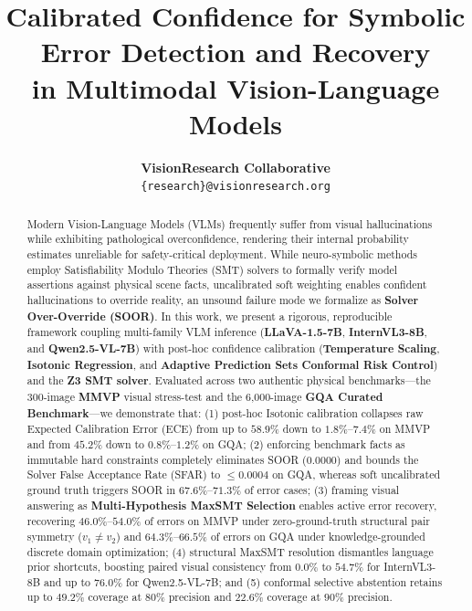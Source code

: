 \documentclass[10pt,twocolumn,letterpaper]{article}
\title{\textbf{Calibrated Confidence for Symbolic Error Detection and Recovery\\in Multimodal Vision-Language Models}}
\author{
  \textbf{VisionResearch Collaborative}\\
  \texttt{\{research\}@visionresearch.org}
}
\date{}
\begin{document}
\maketitle

\begin{abstract}
Modern Vision-Language Models (VLMs) frequently suffer from visual hallucinations while exhibiting pathological overconfidence, rendering their internal probability estimates unreliable for safety-critical deployment. While neuro-symbolic methods employ Satisfiability Modulo Theories (SMT) solvers to formally verify model assertions against physical scene facts, uncalibrated soft weighting enables confident hallucinations to override reality, an unsound failure mode we formalize as \textbf{Solver Over-Override (SOOR)}. In this work, we present a rigorous, reproducible framework coupling multi-family VLM inference (\textbf{LLaVA-1.5-7B}, \textbf{InternVL3-8B}, and \textbf{Qwen2.5-VL-7B}) with post-hoc confidence calibration (\textbf{Temperature Scaling}, \textbf{Isotonic Regression}, and \textbf{Adaptive Prediction Sets Conformal Risk Control}) and the \textbf{Z3 SMT solver}. Evaluated across two authentic physical benchmarks—the 300-image \textbf{MMVP} visual stress-test and the 6,000-image \textbf{GQA Curated Benchmark}—we demonstrate that: (1) post-hoc Isotonic calibration collapses raw Expected Calibration Error (ECE) from up to $58.9\%$ down to $1.8\%$--$7.4\%$ on MMVP and from $45.2\%$ down to $0.8\%$--$1.2\%$ on GQA; (2) enforcing benchmark facts as immutable hard constraints completely eliminates SOOR ($0.0000$) and bounds the Solver False Acceptance Rate (SFAR) to $\le 0.0004$ on GQA, whereas soft uncalibrated ground truth triggers SOOR in $67.6\%$--$71.3\%$ of error cases; (3) framing visual answering as \textbf{Multi-Hypothesis MaxSMT Selection} enables active error recovery, recovering $46.0\%$--$54.0\%$ of errors on MMVP under zero-ground-truth structural pair symmetry ($v_1 \neq v_2$) and $64.3\%$--$66.5\%$ of errors on GQA under knowledge-grounded discrete domain optimization; (4) structural MaxSMT resolution dismantles language prior shortcuts, boosting paired visual consistency from $0.0\%$ to $54.7\%$ for InternVL3-8B and up to $76.0\%$ for Qwen2.5-VL-7B; and (5) conformal selective abstention retains up to $49.2\%$ coverage at $80\%$ precision and $22.6\%$ coverage at $90\%$ precision.
\end{abstract}
\end{document}
